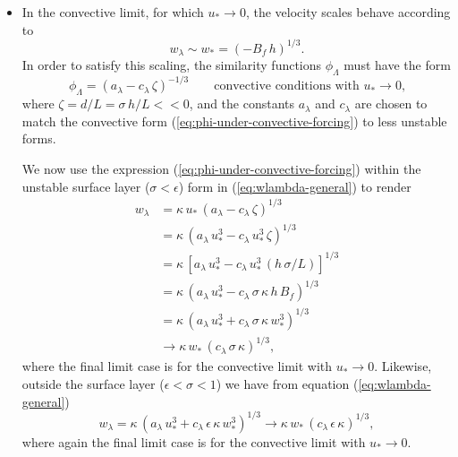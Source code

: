 \begin{itemize}
\begin{itemize}
 \item In the convective limit, for which $u_{*} \rightarrow 0$, the
   velocity scales behave according to 
\begin{equation}
 w_{\lambda} \sim w_{*} = (-B_{f} \, h)^{1/3}.
\label{eq:turbulent-w-in-convective-limit}
 \end{equation}
In order to satisfy this scaling, the similarity functions
$\phi_{\Lambda}$ must have the form 
\begin{equation}
  \phi_{\Lambda} = (a_{\lambda} - c_{\lambda} \, \zeta)^{-1/3}  \qquad \mbox{convective conditions with $u_{*} \rightarrow 0$,}
\label{eq:phi-under-convective-forcing}
\end{equation}
where $\zeta = d/L = \sigma \, h/L << 0$, and the constants
$a_{\lambda}$ and $c_{\lambda}$ are chosen to match the convective
form (\ref{eq:phi-under-convective-forcing}) to less unstable forms.

We now use the expression (\ref{eq:phi-under-convective-forcing})
within the unstable surface layer ($\sigma < \epsilon$) form in
(\ref{eq:wlambda-general}) to render
\begin{subequations}
\begin{align}
w_{\lambda} 
 &= \kappa \, u_{*} \, (a_{\lambda}  - c_{\lambda} \, \zeta)^{1/3}
\\
 &= \kappa \, (a_{\lambda} \, u_{*}^{3} - c_{\lambda} \, u_{*}^{3} \, \zeta)^{1/3}
 \\
 &= \kappa \, [a_{\lambda} \, u_{*}^{3} - c_{\lambda} \, u_{*}^{3} \, (h\, \sigma/L) ]^{1/3}
 \\
 &= \kappa \, (a_{\lambda} \, u_{*}^{3} - c_{\lambda} \, \sigma \, \kappa \, h \, B_{f} )^{1/3}
\\
&= \kappa \, (a_{\lambda} \, u_{*}^{3} + c_{\lambda} \, \sigma \, \kappa \, w_{*}^{3} )^{1/3}
\\
 &\rightarrow 
  \kappa \, w_{*} \, (c_{\lambda} \, \sigma \, \kappa)^{1/3},
\end{align}
\end{subequations}
where the final limit case is for the convective limit with $u_{*}
\rightarrow 0$.  Likewise, outside the surface layer ($\epsilon <
\sigma < 1$) we have from equation (\ref{eq:wlambda-general})
\begin{equation}
w_{\lambda} = \kappa \, (a_{\lambda} \, u_{*}^{3} + c_{\lambda} \, \epsilon \, \kappa \, w_{*}^{3} )^{1/3}
  \rightarrow 
  \kappa \, w_{*} \, (c_{\lambda} \, \epsilon \, \kappa)^{1/3},
\label{eq:wlambda-in-convective-limit}
\end{equation}
where again the final limit case is for the convective limit with
$u_{*} \rightarrow 0$.  

\end{itemize}

\end{itemize}


